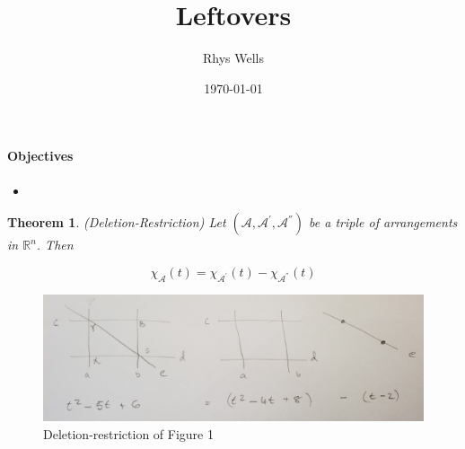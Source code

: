\documentclass[a4paper,12pt]{article}
\title{Leftovers}
\author{Rhys Wells}
\date{\today}
\newtheorem{theorem}{Theorem}[section]
\theoremstyle{definition}
\theoremstyle{indented}
\newenvironment{titlemize}[1]{%
  \paragraph{#1}
  \begin{itemize}}
  {\end{itemize}}
\begin{document}
\maketitle

\begin{titlemize} {Objectives}

\item 

\end{titlemize}


\begin{theorem}(Deletion-Restriction) Let $(\mathcal{A}, \mathcal{A^{'}},\mathcal{A^{''}} )$ be a triple of arrangements in $\mathbb{R}^n$. Then

$$\chi_{{\mathcal{A}}} (t) = \chi_{{\mathcal{A^{'}}}} (t) - \chi_{{\mathcal{A^{''}}}} (t)$$
\end{theorem}

\begin{figure}[H]
    \centering
 \includegraphics[scale=0.10,angle=0]{29072020 pics/del-res.jpg}  
    \caption{Deletion-restriction of Figure 1}
    \label{poset}
\end{figure}
\end{document}

